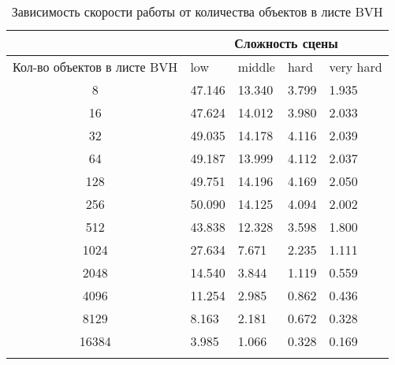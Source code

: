 \begin{center}
\begin{longtable}{|c|p{2cm}|p{2cm}|p{2cm}|p{2cm}|}
\hline & \multicolumn{4}{c|}{Сложность сцены} \\ 
\hline Кол-во объектов в листе BVH & low & middle & hard &  very hard\\ 
\hline 8 &  47.146 & 13.340 & 3.799 & 1.935 \\ 
\hline 16 &  47.624 & 14.012 & 3.980 & 2.033 \\ 
\hline 32 &  49.035 & 14.178 & 4.116 & 2.039 \\ 
\hline 64 &  49.187 & 13.999 & 4.112 & 2.037 \\ 
\hline 128 &  49.751 & 14.196 & 4.169 & 2.050 \\ 
\hline 256 &  50.090 & 14.125 & 4.094 & 2.002 \\ 
\hline 512 &  43.838 & 12.328 & 3.598 & 1.800 \\ 
\hline 1024 &  27.634 & 7.671 & 2.235 & 1.111 \\ 
\hline 2048 &  14.540 & 3.844 & 1.119 & 0.559 \\ 
\hline 4096 &  11.254 & 2.985 & 0.862 & 0.436 \\ 
\hline 8129 &  8.163 & 2.181 & 0.672 & 0.328 \\ 
\hline 16384 &  3.985 & 1.066 & 0.328 & 0.169 \\ 
\hline
\caption{Зависимость скорости работы от количества объектов в листе BVH}\label{tab:performance_bvh}\end{longtable}
\end{center}


